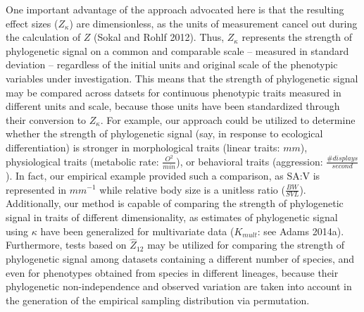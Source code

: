 \documentclass[
]{article}
\begin{document}
One important advantage of the approach advocated here is that the
resulting effect sizes (\(Z_\kappa\)) are dimensionless, as the units of
measurement cancel out during the calculation of \(Z\) (Sokal and Rohlf
2012). Thus, \(Z_\kappa\) represents the strength of phylogenetic signal
on a common and comparable scale -- measured in standard deviation --
regardless of the initial units and original scale of the phenotypic
variables under investigation. This means that the strength of
phylogenetic signal may be compared across datsets for continuous
phenotypic traits measured in different units and scale, because those
units have been standardized through their conversion to \(Z_\kappa\).
For example, our approach could be utilized to determine whether the
strength of phylogenetic signal (say, in response to ecological
differentiation) is stronger in morphological traits (linear traits:
\(mm\)), physiological traits (metabolic rate: \(\frac{O^2}{min}\)), or
behavioral traits (aggression: \(\frac{\#{displays}}{second}\)). In
fact, our empirical example provided such a comparison, as SA:V is
represented in \(mm^{-1}\) while relative body size is a unitless ratio
(\(\frac{BW}{SVL}\)). Additionally, our method is capable of comparing
the strength of phylogenetic signal in traits of different
dimensionality, as estimates of phylogenetic signal using \(\kappa\)
have been generalized for multivariate data (\(K_{mult}\): see Adams
2014a). Furthermore, tests based on \(\hat{Z}_{12}\) may be utilized for
comparing the strength of phylogenetic signal among datasets containing
a different number of species, and even for phenotypes obtained from
species in different lineages, because their phylogenetic
non-independence and observed variation are taken into account in the
generation of the empirical sampling distribution via permutation.
\hfill\break
\end{document}
